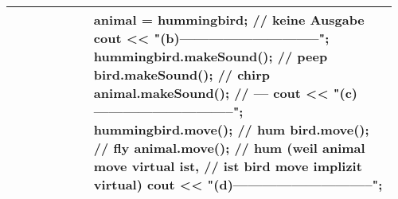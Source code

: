 \documentclass[main.tex,fontsize=8pt,paper=a4,paper=portrait,DIV=calc]{scrartcl}
\begin{document}
\begin{table}[ht!]
\begin{tabular}{|m{0.2\linewidth}|m{0.755\linewidth}|}
\begin{lstlisting}
struct Bird : Animal {
    virtual auto makeSound() -> void { cout << "chirp\n"; }
    auto move() -> void { cout << "fly\n"; }

    Bird() { cout << "bird hatched\n"; }
    ~Bird() { cout << "bird crashed\n"; }
};

struct Hummingbird : Bird {
    auto makeSound() -> void { cout << "peep\n"; }
    virtual auto move() -> void { cout << "hum\n"; }

    Hummingbird() { cout << "hummingbird hatched\n"; }
    ~Hummingbird() { cout << "hummingbird died\n"; }
};

auto main() -> int {
    cout << "(a)----------------------------\n";
    Hummingbird hummingbird;        // animal born
    Bird bird = hummingbird;        // keine Ausgabe
    Animal &animal = hummingbird;   // keine Ausgabe
    cout << "(b)-----------------------------\n";
    hummingbird.makeSound();        // peep
    bird.makeSound();               // chirp
    animal.makeSound();             // ---
    cout << "(c)-----------------------------\n";
    hummingbird.move();             // hum
    bird.move();                    // fly
    animal.move();                  // hum (weil animal move virtual ist, 
                                    // ist bird move implizit virtual)
    cout << "(d)-----------------------------\n";
}
\end{lstlisting}
\\
\hline
\end{tabular}
\end{table}
\pagebreak
\end{document}
